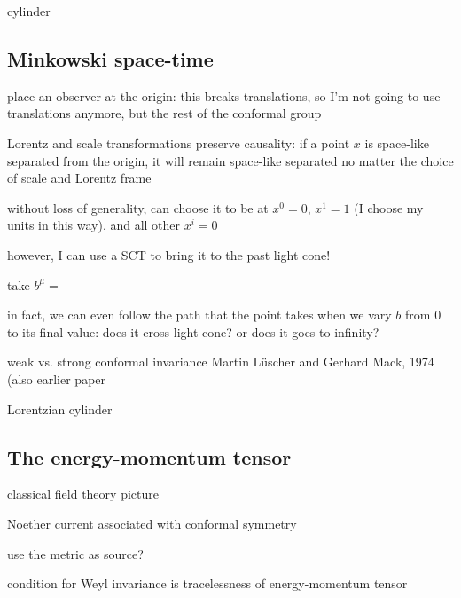 \documentclass[a4paper,12pt]{article}
\numberwithin{equation}{section}
\begin{document}
cylinder

\subsection{Minkowski space-time}


place an observer at the origin: this breaks translations, so I'm not going to use translations anymore, but the rest of the conformal group

Lorentz and scale transformations preserve causality:
if a point $x$ is space-like separated from the origin, it will remain space-like separated no matter the choice of scale and Lorentz frame

without loss of generality, can choose it to be at $x^0 = 0$, $x^1 = 1$ (I choose my units in this way), and all other $x^i = 0$

however, I can use a SCT to bring it to the past light cone!

take $b^\mu = $

in fact, we can even follow the path that the point takes when we vary $b$ from $0$ to its final value: does it cross light-cone? or does it goes to infinity?




weak vs. strong conformal invariance 
Martin Lüscher and Gerhard Mack, 1974 \cite{Luscher:1974ez} (also earlier paper \cite{Go:1974mod}



Lorentzian cylinder

\subsection{The energy-momentum tensor}


classical field theory picture


Noether current associated with conformal symmetry

use the metric as source?

condition for Weyl invariance is tracelessness of energy-momentum tensor
\end{document}
